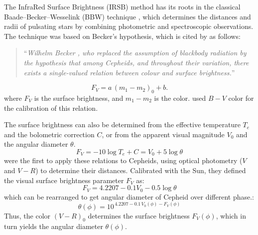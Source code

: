 

The InfraRed Surface Brightness (IRSB) method has its roots in the classical Baade--Becker--Wesselink (BBW) technique \citep{1926baade,1940Becker,1946wesselink}, which determines the distances and radii of pulsating stars by combining photometric and spectroscopic observations. The technique was based on Becker's hypothesis, which is cited by \citet{1946wesselink} as follows:

\begin{quote}
``\textit{Wilhelm Becker \citep{1935becker}, who replaced the assumption of blackbody radiation by the hypothesis that among Cepheids, and throughout their variation, there exists a single-valued relation between colour and surface brightness.}''
\end{quote}
\begin{equation}
F_V = a\,(m_1 - m_2)_0 + b.
\end{equation}
where $F_V$ is the surface brightness, and $m_1 - m_2$ is the color. \cite{1969wesselink} used $B-V$ color for the calibration of this relation. 

The surface brightness can also be determined from the effective temperature $T_e$ and the bolometric correction $C$, or from the apparent visual magnitude $V_0$ and the angular diameter $\theta$.
\begin{equation}
F_V = -10 \log T_e +  C  = V_0 + 5 \log \theta
\end{equation}
\cite{1976barnes} were the first to apply these relations to Cepheids, using optical photometry ($V$ and $V\!-\!R$) to determine their distances. Calibrated with the Sun, they defined the visual surface brightness parameter $F_V$ as:
\begin{equation}
F_V = 4.2207 - 0.1V_0 - 0.5 \log \theta
\end{equation}
which can be rearranged to get angular diameter of Cepheid over different phase.:
\begin{equation}
\theta(\phi) = 10^{\,4.2207 - 0.1\,V_0(\phi) - F_V(\phi)}
\end{equation}
Thus, the color $(V - R)_0$ determines the surface brightness $F_V(\phi)$, which in turn yields the angular diameter $\theta(\phi)$. 

